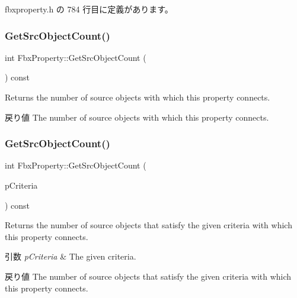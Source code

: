  fbxproperty.\+h の 784 行目に定義があります。

\mbox{\label{class_fbx_property_a4b6d431d87134722800f06e4cb442335}} 
\subsubsection{\texorpdfstring{Get\+Src\+Object\+Count()}{GetSrcObjectCount()}\hspace{0.1cm}{\footnotesize\ttfamily [1/4]}}
{\footnotesize\ttfamily int Fbx\+Property\+::\+Get\+Src\+Object\+Count (\begin{DoxyParamCaption}{ }\end{DoxyParamCaption}) const}

Returns the number of source objects with which this property connects. \begin{DoxyReturn}{戻り値}
The number of source objects with which this property connects. 
\end{DoxyReturn}
\mbox{\label{class_fbx_property_ad90aa5b8d3fbe78a9bf541dcbcf9c210}} 
\subsubsection{\texorpdfstring{Get\+Src\+Object\+Count()}{GetSrcObjectCount()}\hspace{0.1cm}{\footnotesize\ttfamily [2/4]}}
{\footnotesize\ttfamily int Fbx\+Property\+::\+Get\+Src\+Object\+Count (\begin{DoxyParamCaption}\item[{const \hyperlink{class_fbx_criteria}{Fbx\+Criteria} \&}]{p\+Criteria }\end{DoxyParamCaption}) const}

Returns the number of source objects that satisfy the given criteria with which this property connects. 
\begin{DoxyParams}{引数}
{\em p\+Criteria} & The given criteria. \\
\hline
\end{DoxyParams}
\begin{DoxyReturn}{戻り値}
The number of source objects that satisfy the given criteria with which this property connects. 
\end{DoxyReturn}
\mbox{\label{class_fbx_property_a876b4f2219a1ca16337f35b27a76eed4}} 
